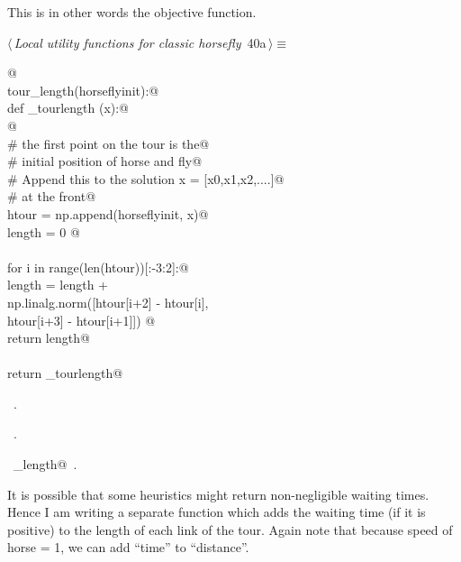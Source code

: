 \documentclass[11.5pt]{report}
\begin{document}
   This is in other words the objective function. 

\begin{flushleft} \small\label{scrap39}\raggedright\small
{} $\langle\,${\itshape Local utility functions for classic horsefly}\nobreak\ {\footnotesize {40a}}$\,\rangle\equiv$
\vspace{-1ex}
\begin{list}{}{} \item
\mbox{}\verb@   @\\
\mbox{}\verb@def tour_length(horseflyinit):@\\
\mbox{}\verb@   def _tourlength (x):@\\
\mbox{}\verb@         @\\
\mbox{}\verb@        # the first point on the tour is the@\\
\mbox{}\verb@        # initial position of horse and fly@\\
\mbox{}\verb@        # Append this to the solution x = [x0,x1,x2,....]@\\
\mbox{}\verb@        # at the front@\\
\mbox{}\verb@        htour = np.append(horseflyinit, x)@\\
\mbox{}\verb@        length = 0 @\\
\mbox{}\verb@@\\
\mbox{}\verb@        for i in range(len(htour))[:-3:2]:@\\
\mbox{}\verb@                length = length + \@\\
\mbox{}\verb@                         np.linalg.norm([htour[i+2] - htour[i], \@\\
\mbox{}\verb@                                         htour[i+3] - htour[i+1]]) @\\
\mbox{}\verb@        return length@\\
\mbox{}\verb@@\\
\mbox{}\verb@   return _tourlength@\\
\mbox{}\verb@@{\NWsep}
\end{list}
\vspace{-1.5ex}
\footnotesize
\begin{list}{}{\setlength{\itemsep}{-\parsep}\setlength{\itemindent}{-\leftmargin}}
\item \NWtxtMacroDefBy\ .
\item \NWtxtMacroRefIn\ .
\item \NWtxtIdentsDefed\nobreak\  \verb@tour_length@\nobreak\ .
\item{}
\end{list}
\vspace{4ex}
\end{flushleft}
\newchunk It is possible that some heuristics might return non-negligible
      waiting times. Hence I am writing a separate function which
      adds the waiting time (if it is positive) to the length of 
      each link of the tour. Again note that because 
      speed of horse = 1, we can add ``time'' to ``distance''. 
\end{document}
